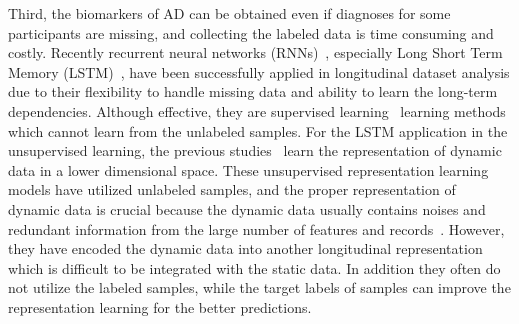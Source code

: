 Third, the biomarkers of AD can be obtained even if diagnoses for some participants are missing, and collecting the labeled data is time consuming and costly. Recently recurrent neural networks (RNNs)~\cite{medsker2001recurrent}, especially Long Short Term Memory (LSTM)~\cite{schmidhuber1997long}, have been successfully applied in longitudinal dataset analysis due to their flexibility to handle missing data and ability to learn the long-term dependencies. Although effective, they are supervised learning~\cite{vieira2017using,hong2019predicting,tabarestani2019longitudinal} learning methods which cannot learn from the unlabeled samples. For the LSTM application in the unsupervised learning, the previous studies~\cite{langkvist2014review,srivastava2015unsupervised} learn the representation of dynamic data in a lower dimensional space. These unsupervised representation learning models have utilized unlabeled samples, and the proper representation of dynamic data is crucial because the dynamic data usually contains noises and redundant information from the large number of features and records~\cite{tuncel2018autoregressive,langkvist2014review}. However, they have encoded the dynamic data into another longitudinal representation which is difficult to be integrated with the static data. In addition they often do not utilize the labeled samples, while the target labels of samples can improve the representation learning for the better predictions.

    
